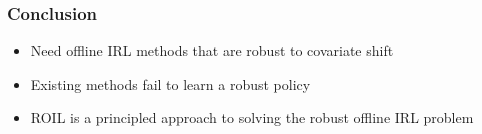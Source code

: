 \documentclass{beamer}
\begin{document}
\begin{frame}
	\frametitle{Conclusion}
	\begin{itemize}
		\item Need offline IRL methods that are robust to covariate shift
		\vfill
		\item Existing methods fail to learn a robust policy
		\vfill
		\item ROIL is a principled approach to solving the robust offline IRL problem
	\end{itemize}
\end{frame}
\end{document}
